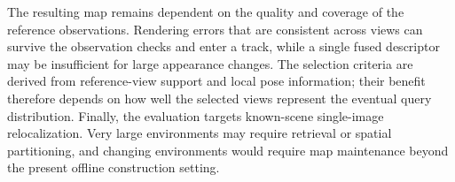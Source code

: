 The resulting map remains dependent on the quality and coverage of the reference observations. Rendering errors that are consistent across views can survive the observation checks and enter a track, while a single fused descriptor may be insufficient for large appearance changes. The selection criteria are derived from reference-view support and local pose information; their benefit therefore depends on how well the selected views represent the eventual query distribution. Finally, the evaluation targets known-scene single-image relocalization. Very large environments may require retrieval or spatial partitioning, and changing environments would require map maintenance beyond the present offline construction setting.